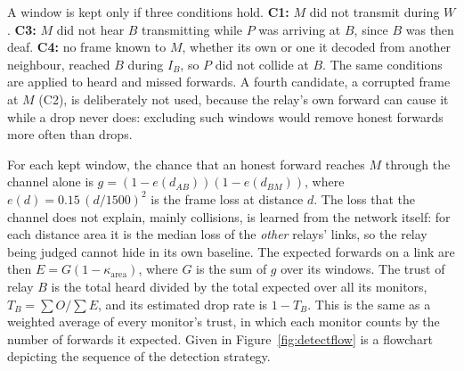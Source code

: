 \documentclass[conference]{IEEEtran}
\begin{document}
A window is kept only if three conditions hold. \textbf{C1:} $M$ did not transmit during $W$. \textbf{C3:} $M$ did not hear $B$ transmitting while $P$ was arriving at $B$, since $B$ was then deaf. \textbf{C4:} no frame known to $M$, whether its own or one it decoded from another neighbour, reached $B$ during $I_B$, so $P$ did not collide at $B$. The same conditions are applied to heard and missed forwards. A fourth candidate, a corrupted frame at $M$ (C2), is deliberately not used, because the relay's own forward can cause it while a drop never does: excluding such windows would remove honest forwards more often than drops.

For each kept window, the chance that an honest forward reaches $M$ through the channel alone is $g=(1-e(d_{AB}))(1-e(d_{BM}))$, where $e(d)=0.15\,(d/1500)^2$ is the frame loss at distance $d$. The loss that the channel does not explain, mainly collisions, is learned from the network itself: for each distance area it is the median loss of the \emph{other} relays' links, so the relay being judged cannot hide in its own baseline. The expected forwards on a link are then $E=G(1-\kappa_{\mathrm{area}})$, where $G$ is the sum of $g$ over its windows. The trust of relay $B$ is the total heard divided by the total expected over all its monitors, $T_B=\sum O/\sum E$, and its estimated drop rate is $1-T_B$. This is the same as a weighted average of every monitor's trust, in which each monitor counts by the number of forwards it expected. Given in Figure~\ref{fig:detectflow} is a flowchart depicting the sequence of the detection strategy.
\end{document}
